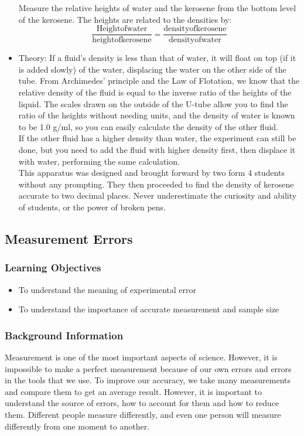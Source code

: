 \begin{itemize}
{Measure the relative heights of water and the kerosene from the bottom level of the kerosene. The heights are related to the densities by:
\[ \frac{\mathrm{Height of water}}{\mathrm{height of kerosene}} = \frac{\mathrm{density of kerosene}}{\mathrm{density of water}} \]
} %
\item{Theory: If a fluid’s density is less than that of water, it will float on top (if it is added slowly) of the water, displacing the water on the other side of the tube. From Archimedes’ principle and the Law of Flotation, we know that the relative density of the fluid is equal to the inverse ratio of the heights of the liquid. The scales drawn on the outside of the U-tube allow you to find the ratio of the heights without needing units, and the density of water is known to be 1.0 g/ml, so you can easily calculate the density of the other fluid.\\
If the other fluid has a higher density than water, the experiment can still be done, but you need to add the fluid with higher density first, then displace it with water, performing the same calculation.\\
This apparatus was designed and brought forward by two form 4 students without any prompting. They then proceeded to find the density of kerosene accurate to two decimal places. Never underestimate the curiosity and ability of students, or the power of broken pens.}
\end{itemize}


\subsection{Measurement Errors}

\subsubsection*{Learning Objectives}
\begin{itemize}
\item{To understand the meaning of experimental error}
\item{To understand the importance of accurate measurement and sample size}
\end{itemize}

\subsubsection*{Background Information}
Measurement is one of the most important aspects of science. However, it is impossible to make a perfect measurement because of our own errors and errors in the tools that we use. To improve our accuracy, we take many measurements and compare them to get an average result. However, it is important to understand the source of errors, how to account for them and how to reduce them. Different people measure differently, and even one person will measure differently from one moment to another.

